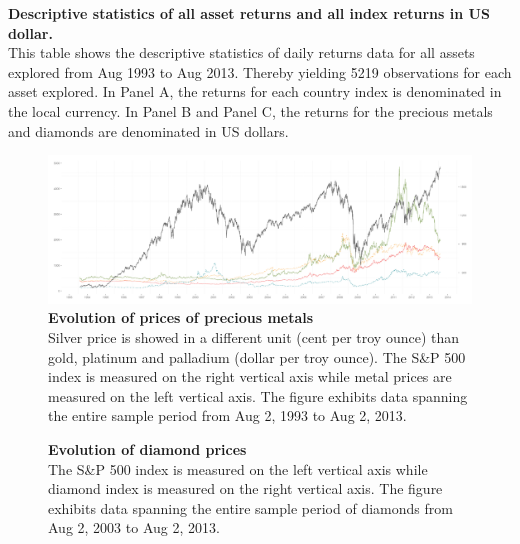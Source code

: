 \documentclass[preprint,authoryear,11pt]{elsarticle}
\begin{document}
\begin{table}[htp!]
\scriptsize \centering
\captionsetup{labelfont=bf,font=footnotesize,skip=0.1cm}
\caption{\textbf{Descriptive statistics of all asset returns and all index returns in US dollar.}\\
This table shows the descriptive statistics of daily returns data for all assets explored from Aug 1993 to Aug 2013.  Thereby yielding 5219 observations for each asset explored. In Panel A, the returns for each country index is denominated in the local currency.  In Panel B and Panel C, the returns for the precious metals and diamonds are denominated in US dollars.} \label{tab:data_descrip}
\begin{threeparttable}

\end{threeparttable}
\end{table}


\begin{figure}
\centering
\includegraphics[width=1\textwidth]{metal_prices}
\captionsetup{labelfont=bf,font=footnotesize,skip=0.1cm}
\caption{\textbf{Evolution of prices of precious metals}\\
Silver price is showed in a different unit (cent per troy ounce) than gold, platinum and palladium (dollar per troy ounce). The S\&P 500 index is measured on the right vertical axis while metal prices are measured on the left vertical axis. The figure exhibits data spanning the entire sample period from Aug 2, 1993 to Aug 2, 2013.}\label{fig:metal_sp500}
\end{figure}

\begin{figure}
\centering
\captionsetup{labelfont=bf,font=footnotesize,skip=0.1cm}
\caption{\textbf{Evolution of diamond prices }\\
The S\&P 500 index is measured on the left vertical axis while diamond index is measured on the right vertical axis. The figure exhibits data spanning the entire sample period of diamonds from Aug 2, 2003 to Aug 2, 2013.}\label{fig:diamond_sp500}
\end{figure}
\end{document}
